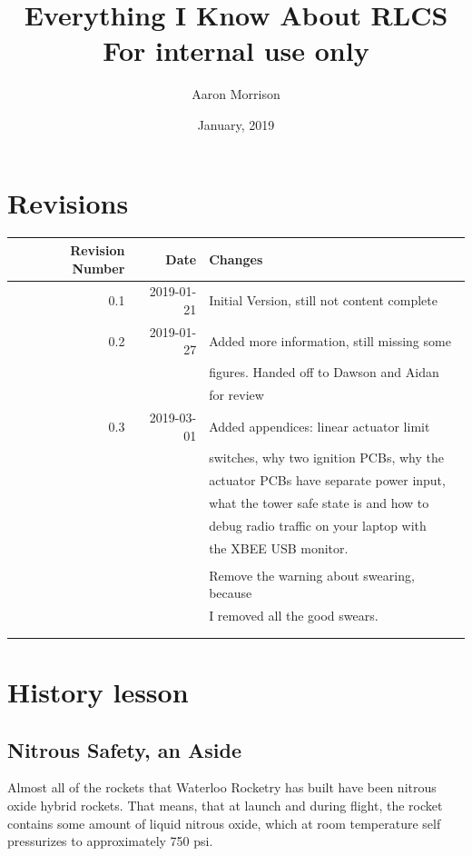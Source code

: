 \documentclass[11pt]{article}
\author{Aaron Morrison}
\date{January, 2019}
\title{Everything I Know About RLCS\\\medskip
\large For internal use only}
\begin{document}
\maketitle
\tableofcontents


\section{Revisions}
\label{sec:org9c9debc}
\begin{center}
\begin{tabular}{rrl}
Revision Number & Date & Changes\\
\hline
0.1 & 2019-01-21 & Initial Version, still not content complete\\
\hline
0.2 & 2019-01-27 & Added more information, still missing some\\
 &  & figures. Handed off to Dawson and Aidan\\
 &  & for review\\
\hline
0.3 & 2019-03-01 & Added appendices: linear actuator limit\\
 &  & switches, why two ignition PCBs, why the\\
 &  & actuator PCBs have separate power input,\\
 &  & what the tower safe state is and how to\\
 &  & debug radio traffic on your laptop with\\
 &  & the XBEE USB monitor.\\
 &  & \\
 &  & Remove the warning about swearing, because\\
 &  & I removed all the good swears.\\
 &  & \\
 &  & \\
\end{tabular}
\end{center}


\section{History lesson}
\label{sec:orgdaeb114}

\subsection{Nitrous Safety, an Aside}
\label{sec:org35e2bab}
Almost all of the rockets that Waterloo Rocketry has built have been nitrous
oxide hybrid rockets. That means, that at launch and during flight, the rocket
contains some amount of liquid nitrous oxide, which at room temperature self
pressurizes to approximately 750 psi.
\end{document}
